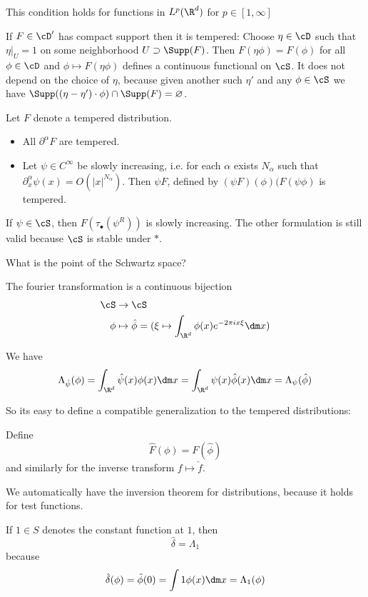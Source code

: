 \begin{example}
	This condition holds for functions in $L^p(\R^d)$ for $p \in [1,\infty]$
\end{example}
\begin{lemma}
	If $F \in \cD'$ has compact support then it is tempered: Choose $\eta \in \cD$ such that $\eta|_U = 1$ on some neighborhood $U \supset \Supp(F)$. Then $F(\eta \phi) = F(\phi)$ for all $\phi \in \cD$ and $\phi \mapsto F (\eta \phi)$ defines a continuous functional on $\cS$. It does not depend on the choice of $\eta$, because given another such $\eta'$ and any $\phi \in \cS$ we have $\Supp((\eta - \eta') \cdot \phi) \cap \Supp(F) = \varnothing$.
\end{lemma}
Let $F$ denote a tempered distribution.
\begin{lemma}

	\begin{itemize}
		\item All $\partial^\alpha F$ are tempered.
		\item Let $\psi \in C^\infty$ be slowly increasing, i.e. for each $\alpha$ exists $N_\alpha$ such that $\partial_x^\alpha \psi(x) = O(|x|^{N_\alpha})$. Then $\psi F$, defined by $(\psi F)(\phi)(F(\psi \phi)$ is tempered.
	\end{itemize}
\end{lemma}
\begin{example}
	If $\psi \in \cS$, then $F(\tau_\bullet (\psi^R))$ is slowly increasing. The other formulation is still valid because $\cS$ is stable under $*$.
\end{example}
What is the point of the Schwartz space?
\begin{definition}
	The fourier transformation is a continuous bijection
	\begin{align*}
		\cS &\to \cS \\
		\phi &\mapsto \hat \phi  = (\xi \mapsto \int_{\R^d} \phi(x) e^{-2\pi i x \xi} \dm x)
	\end{align*}
\end{definition}

\begin{lemma}
	We have
	\[\Lambda_{\hat \psi}(\phi) = \int_{\R^d} \hat \psi (x) \phi(x) \dm x = \int_{\R^d} \psi(x) \hat \phi(x) \dm x = \Lambda_{\psi}(\hat \phi)\]
\end{lemma}
So its easy to define a compatible generalization to the tempered distributions:
\begin{definition}
	Define
	\[
	\hat F (\phi) = F (\hat \phi)
	\]
	and similarly for the inverse transform $f \mapsto \check{f}$.
\end{definition}
We automatically have the inversion theorem for distributions, because it holds for test functions.
\begin{example}
	If $1 \in S$ denotes the constant function at $1$, then
	\[
	\widehat {\delta} = \Lambda_1
	\]
	because
	\[
	\hat \delta (\phi) =\hat \phi(0) = \int 1 \phi(x) \dm x = \Lambda_1(\phi)
	\]
\end{example}

